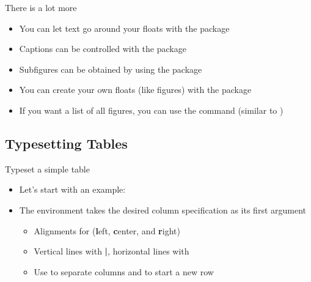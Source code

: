 \begin{frame}{There is a lot more}
   \begin{itemize}
      \itemsep8pt
      \item You can let text go around your floats with the  package
      \item Captions can be controlled with the  package
      \item Subfigures can be obtained by using the  package
      \item You can create your own floats (like figures) with the  package
      \item If you want a list of all figures, you can use the \blatex{\\listoffigures} command (similar to \blatex{\\tableofcontents})
   \end{itemize}
\end{frame}

\subsection{Typesetting Tables}


\begin{frame}{Typeset a simple table}
   \begin{itemize}
      \item Let's start with an example:
      \soldisablenumhl{}
      \item The  environment takes the desired column specification as its first argument \begin{itemize}
         \item Alignments for (\textbf{l}eft, \textbf{c}enter, and \textbf{r}ight)
         \item Vertical lines with \textbf{|}, horizontal lines with \blatex{\\hline}
         \item Use \blatex{\&} to separate columns and \blatex{\\\\} to start a new row
      \end{itemize}
   \end{itemize}
\end{frame}


